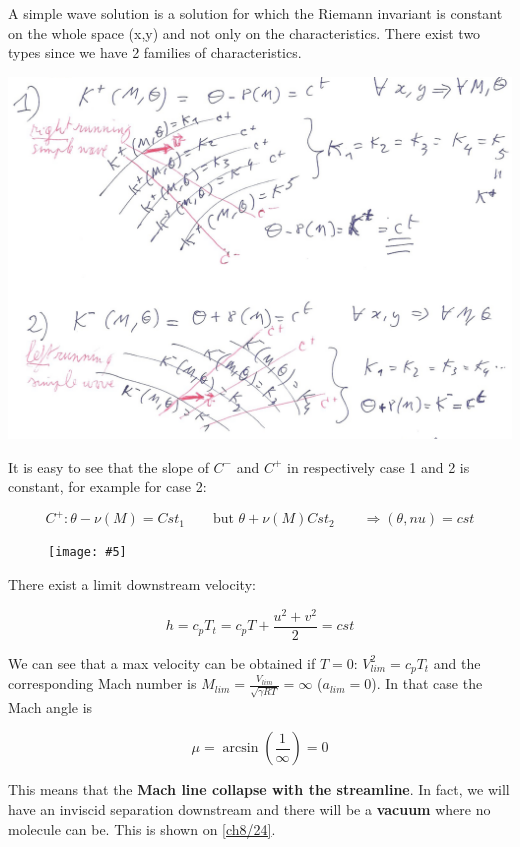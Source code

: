 \documentclass[british,french,11pt, a4paper, openany]{article}
\newcommand{\wrapfig}[6]{%
	\begin{figure}%
		\vspace{-5mm}%
		\texttt{[image: \#5]}%
		\captionof{figure}{}%
		\label{#6}%
	\end{figure}%
}
\begin{document}
A simple wave solution is a solution for which the Riemann invariant is constant on the whole space (x,y)	and not only on the characteristics. There exist two types since we have 2 families of characteristics. 

\begin{center}
	\includegraphics[scale=0.15]{ch8/21}
\end{center}

It is easy to see that the slope of $C^-$ and $C^+$ in respectively case 1 and 2 is constant, for example for case 2: 

\begin{equation}
C^+ : \theta - \nu (M) = {Cst}_1 \qquad \mbox{but } \theta + \nu(M) {Cst}_2\qquad \Rightarrow (\theta  , nu)= cst
\end{equation}

\wrapfig{17}{l}{6}{0.15}{ch8/23}{ch8/23}
There exist a limit downstream velocity: 

\begin{equation}
h = c_pT_t = c_p T + \frac{u^2 + v^2}{2} = cst
\end{equation}

We can see that a max velocity can be obtained if $T = 0$: $V_{lim}^2 = c_p T_t$ and the corresponding Mach number is $M_{lim} = \frac{V_{lim}}{\sqrt{\gamma RT}} = \infty$ ($a_{lim}=0$). In that case the Mach angle is 

\begin{equation}
\mu = \arcsin \left( \frac{1}{\infty} \right) = 0
\end{equation}

This means that the \textbf{Mach line collapse with the streamline}. In fact, we will have an inviscid separation downstream and there will be a \textbf{vacuum} where no molecule can be. This is shown on \autoref{ch8/24}.
\end{document}
